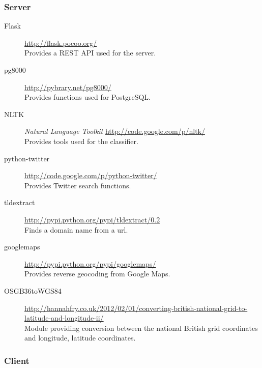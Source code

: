 \subsubsection{Server}

\begin{description}
    \item[Flask] \url{http://flask.pocoo.org/} \hfill \\
        Provides a REST API used for the server.
    \item[pg8000] \url{http://pybrary.net/pg8000/} \hfill \\
        Provides functions used for PostgreSQL.
    \item[NLTK] \emph{Natural Language Toolkit} \url{http://code.google.com/p/nltk/} \hfill \\
        Provides tools used for the classifier.
    \item[python-twitter] \url{http://code.google.com/p/python-twitter/} \hfill \\
        Provides Twitter search functions.
    \item[tldextract] \url{http://pypi.python.org/pypi/tldextract/0.2} \hfill \\
        Finds a domain name from a url.
    \item[googlemaps] \url{http://pypi.python.org/pypi/googlemaps/} \hfill \\
        Provides reverse geocoding from Google Maps.
    \item[OSGB36toWGS84] \url{http://hannahfry.co.uk/2012/02/01/converting-british-national-grid-to-latitude-and-longitude-ii/} \hfill \\
        Module providing conversion between the national British grid coordinates and longitude, latitude coordinates.
\end{description}

\subsubsection{Client}


